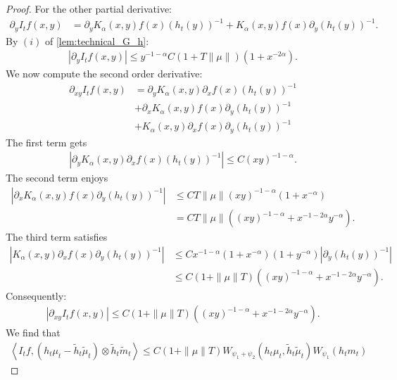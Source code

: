 \documentclass[11pt,a4paper]{article}
\newcommand{\brac}[1]{\left\langle#1\right\rangle}
\begin{document}
\begin{proof}
    For the other partial derivative:
    \begin{align*}
        \partial_y I_tf(x,y) 
        &= \partial_y K_\alpha(x,y) f(x) \left(h_t(y)\right)^{-1} + K_\alpha(x,y)  f(x) \partial_y \left(h_t(y)\right)^{-1}.
    \end{align*}
    By $(i)$ of \ref{lem:technical_G_h}:
    \begin{align*}
        \left|\partial_y I_tf(x,y)  \right| \leq y^{-1-\alpha} C(1 + T\|\mu\|)\left(1 + x^{-2\alpha} \right).
    \end{align*}  
    We now compute the second order derivative:
    \begin{align*}
        \partial_{xy} I_tf(x,y) &= \partial_y K_\alpha(x,y) \partial_x f(x)\left(h_t(y)\right)^{-1} \\
        &+ \partial_x K_\alpha(x,y) f(x) \partial_y \left(h_t(y)\right)^{-1} \\
        &+ K_\alpha(x,y)  \partial_x f(x) \partial_y \left(h_t(y)\right)^{-1}
    \end{align*}
    The first term gets
    \begin{align*}
        \left|\partial_y K_\alpha(x,y) \partial_x f(x)\left(h_t(y)\right)^{-1}  \right| \leq C (xy)^{-1-\alpha}.
    \end{align*}
    The second term enjoys
    \begin{align*}
        \left| \partial_x K_\alpha(x,y) f(x) \partial_y \left(h_t(y)\right)^{-1} \right| 
        &\leq CT\|\mu\| (xy)^{-1-\alpha} (1 + x^{-\alpha}) \\
        &= CT\|\mu\| \left((xy)^{-1-\alpha} + x^{-1-2\alpha}y^{-\alpha}\right).
    \end{align*}
    The third term satisfies
    \begin{align*}
        \left|K_\alpha(x,y)  \partial_x f(x) \partial_y \left(h_t(y)\right)^{-1}\right| 
        &\leq Cx^{-1-\alpha}(1 + x^{-\alpha})(1 + y^{-\alpha})\left| \partial_y \left(h_t(y)\right)^{-1}\right|\\
        &\leq C(1 + \|\mu\|T) \left((xy)^{-1-\alpha} + x^{-1-2\alpha}y^{-\alpha}\right).
    \end{align*}
    Consequently:
    \begin{align*}
        \left| \partial_{xy} I_tf(x,y)\right| \leq C(1 + \|\mu\|T) \left((xy)^{-1-\alpha} + x^{-1-2\alpha}y^{-\alpha}\right).
    \end{align*}
    We find that 
    \begin{align*}
        \brac{I_tf,\left(h_t\mu_t - \tilde{h}_t\tilde{\mu}_t\right)\otimes \tilde{h}_t\tilde{m}_t}  \leq C\left(1 + \|\mu\|T\right)W_{\psi_1 + \psi_2}\left( h_t\mu_t , \tilde{h}_t\tilde{\mu}_t\right)W_{\psi_1}\left(h_t m_t \right)

\end{align*}
\end{proof}
\end{document}
